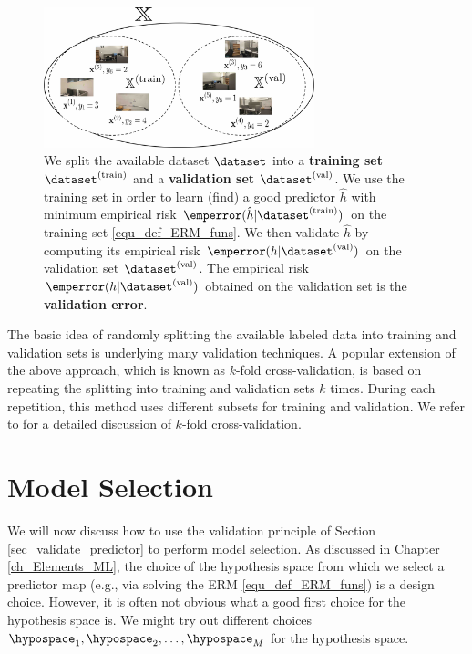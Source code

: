 \documentclass[12pt]{report}
\begin{document}
 \begin{figure}[htbp]
    \centering
   \includegraphics[width=0.7\textwidth]{TrainValSmall.jpg}  
    \caption{We split the available dataset $\dataset$ into a 
    	{\bf training set} $\dataset^{(\rm train)}$ and a {\bf validation set} 
    	$\dataset^{(\rm val)}$. We use the training set in order to 
    	learn (find) a good predictor $\hat{h}$ with minimum 
    	empirical risk $\emperror(\hat{h}| \dataset^{(\rm train)})$ on the training set \eqref{equ_def_ERM_funs}. 
        We then validate $\hat{h}$ by computing its empirical risk $\emperror(h| \dataset^{(\rm val)})$  
        on the validation set $\dataset^{(\rm val)}$. The empirical risk $\emperror(h| \dataset^{(\rm val)})$ 
        obtained on the validation set is the {\bf validation error}.}
    \label{fig_split_train_val}
\end{figure}

The basic idea of randomly splitting the available labeled data into training and 
validation sets is underlying many validation techniques. A popular extension 
of the above approach, which is known as $k$-fold cross-validation, is based 
on repeating the splitting into training and validation sets $k$ times. During 
each repetition, this method uses different subsets for training and validation. 
We refer to \cite[Sec. 7.10]{hastie01statisticallearning} for a detailed discussion of $k$-fold 
cross-validation. 

\section{Model Selection}
\label{sec_modsel}

We will now discuss how to use the validation principle of 
Section \ref{sec_validate_predictor} to perform model selection. 
As discussed in Chapter \ref{ch_Elements_ML}, the choice of 
the hypothesis space from which we select a predictor map 
(e.g., via solving the ERM \eqref{equ_def_ERM_funs}) is a design choice. 
However, it is often not obvious what a good first choice 
for the hypothesis space is. We might try out different 
choices $\hypospace_{1},\hypospace_{2},\ldots,\hypospace_{M}$ 
for the hypothesis space. 
\end{document}
